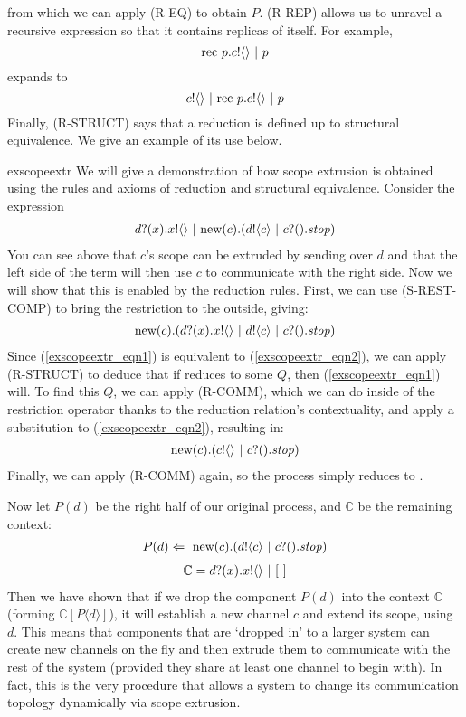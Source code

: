from which we can apply (R-EQ) to obtain $P$.
(R-REP) allows us to unravel a recursive expression so that it contains replicas of itself.  
For example,
\[
	\text{rec }{p}. {c}!\langle{}\rangle \ |\  p
\]
expands to
\[
	{c}!\langle{}\rangle \ |\  \text{rec }{p}. {c}!\langle{}\rangle \ |\  p
\]
Finally, (R-STRUCT) says that a reduction is defined up to structural equivalence.  
We give an example of its use below.
\begin{example}{exscopeextr}
	We will give a demonstration of how scope extrusion is obtained using the rules and axioms of reduction and structural equivalence.  
Consider the expression 
\begin{align}\label{exscopeextr_eqn1}
	{d}?({x}).{x}!\langle{}\rangle\ |\  \text{new}({c}).({d}!\langle{c}\rangle \ |\  {c}?({}).\mbox{\emph{stop}})	
\end{align}
You can see above that $c$'s scope can be extruded by sending over $d$ and that the left side of the term will then use $c$ to communicate with the right side.  
Now we will show that this is enabled by the reduction rules.  
First, we can use (S-REST-COMP) to bring the restriction to the outside, giving:
\begin{align}\label{exscopeextr_eqn2}
	\text{new}({c}).({d}?({x}).{x}!\langle{}\rangle\ |\  {d}!\langle{c}\rangle \ |\  {c}?({}).\mbox{\emph{stop}})		
\end{align}
	Since (\ref{exscopeextr_eqn1}) is equivalent to (\ref{exscopeextr_eqn2}), we can apply (R-STRUCT) to deduce that if \label{exscopeextr_eqn2} reduces to some $Q$, then (\ref{exscopeextr_eqn1}) will.
	To find this $Q$, we can apply (R-COMM), which we can do inside of the restriction operator thanks to the reduction relation's contextuality, and apply a substitution to (\ref{exscopeextr_eqn2}), resulting in:
\begin{align}
	\text{new}({c}).({c}!\langle{}\rangle \ |\  {c}?({}).\mbox{\emph{stop}})
\end{align}
	Finally, we can apply (R-COMM) again, so the process simply reduces to \pstop.  


	Now let $P(d)$ be the right half of our original process, and $\mathbb{C}$ be the remaining context:
	\begin{align}
		P(d) \Leftarrow\  \text{new}({c}).({d}!\langle{c}\rangle \ |\  {c}?({}).\mbox{\emph{stop}})
	\end{align}
	\begin{align}
		\mathbb{C} = {d}?({x}).{x}!\langle{}\rangle \ |\  [\ ]
	\end{align}
Then we have shown that if we drop the component $P(d)$ into the context $\mathbb{C}$ (forming $\mathbb{C}[P\langle d \rangle]$), it will establish a new channel $c$ and extend its scope, using $d$.
This means that components that are `dropped in' to a larger system can create new channels on the fly and then extrude them to communicate with the rest of the system (provided they share at least one channel to begin with).  
In fact, this is the very procedure that allows a system to change its communication topology dynamically via scope extrusion.
\end{example}

